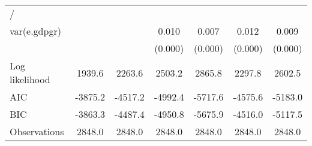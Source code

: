 \begin{table}[htbp]
\begin{tabular}{l*{6}{c}}
\hline
/                   &                     &                     &                     &                     &                     &                     \\
var(e.gdpgr)        &                     &                     &       0.010\sym{***}&       0.007\sym{***}&       0.012\sym{***}&       0.009\sym{***}\\
                    &                     &                     &     (0.000)         &     (0.000)         &     (0.000)         &     (0.000)         \\
\hline
Log likelihood      &      1939.6         &      2263.6         &      2503.2         &      2865.8         &      2297.8         &      2602.5         \\
AIC                 &     -3875.2         &     -4517.2         &     -4992.4         &     -5717.6         &     -4575.6         &     -5183.0         \\
BIC                 &     -3863.3         &     -4487.4         &     -4950.8         &     -5675.9         &     -4516.0         &     -5117.5         \\
Observations        &      2848.0         &      2848.0         &      2848.0         &      2848.0         &      2848.0         &      2848.0         \\
\hline\hline
\end{tabular}
\end{table}
